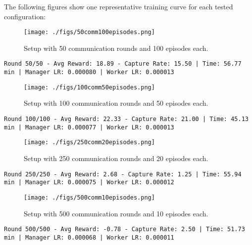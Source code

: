 \documentclass[12pt,a4paper,twoside,openany]{book}
\begin{document}
The following figures show one representative training curve for each tested configuration:

\begin{figure}[H]
\centering
\texttt{[image: ./figs/50comm100episodes.png]}
\captionsetup{font=small}
\caption{Setup with 50 communication rounds and 100 episodes each.}
\label{fig:50_100_setup}
\end{figure}

\begin{lstlisting}
Round 50/50 - Avg Reward: 18.89 - Capture Rate: 15.50 | Time: 56.77 min | Manager LR: 0.000080 | Worker LR: 0.000013 
\end{lstlisting}

\begin{figure}[H]
\centering
\texttt{[image: ./figs/100comm50episodes.png]}
\captionsetup{font=small}
\caption{Setup with 100 communication rounds and 50 episodes each.}
\label{fig:100_50_setup}
\end{figure}

\begin{lstlisting}
Round 100/100 - Avg Reward: 22.33 - Capture Rate: 21.00 | Time: 45.13 min | Manager LR: 0.000077 | Worker LR: 0.000013 
\end{lstlisting}

\begin{figure}[H]
\centering
\texttt{[image: ./figs/250comm20episodes.png]}
\captionsetup{font=small}
\caption{Setup with 250 communication rounds and 20 episodes each.}
\label{fig:250_20_setup}
\end{figure}

\begin{lstlisting}
Round 250/250 - Avg Reward: 2.68 - Capture Rate: 1.25 | Time: 55.94 min | Manager LR: 0.000075 | Worker LR: 0.000012 
\end{lstlisting}

\begin{figure}[H]
\centering
\texttt{[image: ./figs/500comm10episodes.png]}
\captionsetup{font=small}
\caption{Setup with 500 communication rounds and 10 episodes each.}
\label{fig:500_10_setup}
\end{figure}

\begin{lstlisting}
Round 500/500 - Avg Reward: -0.78 - Capture Rate: 2.50 | Time: 51.73 min | Manager LR: 0.000068 | Worker LR: 0.000011  
\end{lstlisting}
\end{document}
